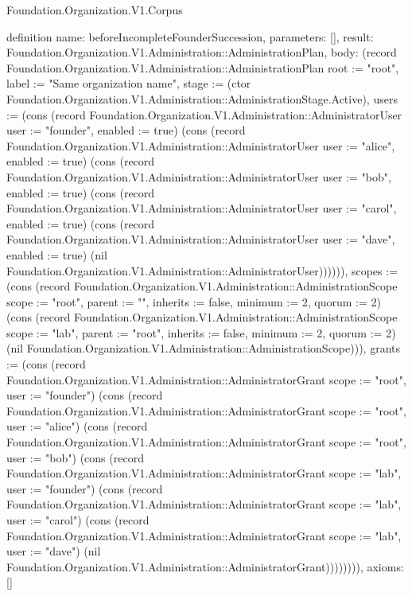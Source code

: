 \begin{lexlean}{Foundation.Organization.V1.Corpus}
\begin{semanticmodule}
definition{
  name: beforeIncompleteFounderSuccession,
  parameters: [],
  result: Foundation.Organization.V1.Administration::AdministrationPlan,
  body: (record Foundation.Organization.V1.Administration::AdministrationPlan {root := "root", label := "Same organization name", stage := (ctor Foundation.Organization.V1.Administration::AdministrationStage.Active), users := (cons (record Foundation.Organization.V1.Administration::AdministratorUser {user := "founder", enabled := true}) (cons (record Foundation.Organization.V1.Administration::AdministratorUser {user := "alice", enabled := true}) (cons (record Foundation.Organization.V1.Administration::AdministratorUser {user := "bob", enabled := true}) (cons (record Foundation.Organization.V1.Administration::AdministratorUser {user := "carol", enabled := true}) (cons (record Foundation.Organization.V1.Administration::AdministratorUser {user := "dave", enabled := true}) (nil Foundation.Organization.V1.Administration::AdministratorUser)))))), scopes := (cons (record Foundation.Organization.V1.Administration::AdministrationScope {scope := "root", parent := "", inherits := false, minimum := 2, quorum := 2}) (cons (record Foundation.Organization.V1.Administration::AdministrationScope {scope := "lab", parent := "root", inherits := false, minimum := 2, quorum := 2}) (nil Foundation.Organization.V1.Administration::AdministrationScope))), grants := (cons (record Foundation.Organization.V1.Administration::AdministratorGrant {scope := "root", user := "founder"}) (cons (record Foundation.Organization.V1.Administration::AdministratorGrant {scope := "root", user := "alice"}) (cons (record Foundation.Organization.V1.Administration::AdministratorGrant {scope := "root", user := "bob"}) (cons (record Foundation.Organization.V1.Administration::AdministratorGrant {scope := "lab", user := "founder"}) (cons (record Foundation.Organization.V1.Administration::AdministratorGrant {scope := "lab", user := "carol"}) (cons (record Foundation.Organization.V1.Administration::AdministratorGrant {scope := "lab", user := "dave"}) (nil Foundation.Organization.V1.Administration::AdministratorGrant)))))))}),
  axioms: []
}


\end{semanticmodule}
\end{lexlean}
